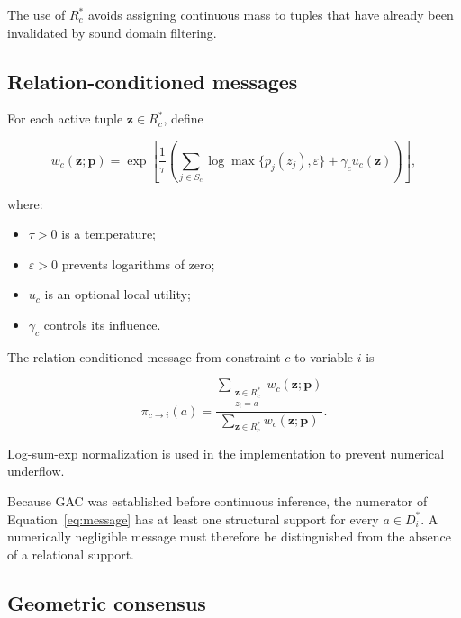 \documentclass[pdflatex,sn-mathphys-num,iicol,oneside]{sn-jnl}
\begin{document}
The use of $R_c^{*}$ avoids assigning continuous mass to tuples that
have already been invalidated by sound domain filtering.

\subsection{Relation-conditioned messages}

For each active tuple $\bm{z}\in R_c^{*}$, define

\begin{equation}
w_c(\bm{z};\bm{p})
=
\exp\left[
\frac{1}{\tau}
\left(
\sum_{j\in S_c}
\log\max\{p_j(z_j),\varepsilon\}
+
\gamma_c u_c(\bm{z})
\right)
\right],
\label{eq:tuple-weight}
\end{equation}

where:

\begin{itemize}
    \item $\tau>0$ is a temperature;
    \item $\varepsilon>0$ prevents logarithms of zero;
    \item $u_c$ is an optional local utility;
    \item $\gamma_c$ controls its influence.
\end{itemize}

The relation-conditioned message from constraint $c$ to variable $i$
is

\begin{equation}
\pi_{c\rightarrow i}(a)
=
\frac{
\displaystyle
\sum_{\substack{\bm{z}\in R_c^{*}\\z_i=a}}
w_c(\bm{z};\bm{p})
}{
\displaystyle
\sum_{\bm{z}\in R_c^{*}}
w_c(\bm{z};\bm{p})
}.
\label{eq:message}
\end{equation}

Log-sum-exp normalization is used in the implementation to prevent
numerical underflow.

Because GAC was established before continuous inference, the
numerator of Equation~\eqref{eq:message} has at least one structural
support for every $a\in D_i^{*}$. A numerically negligible message
must therefore be distinguished from the absence of a relational
support.

\subsection{Geometric consensus}
\end{document}
